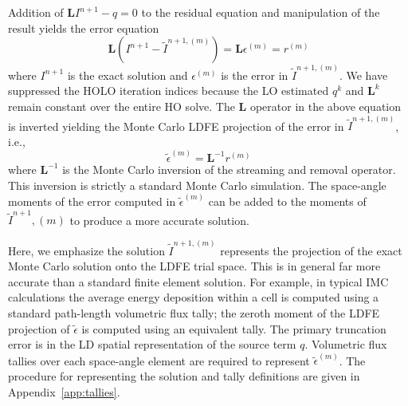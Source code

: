 \documentclass[12pt]{article}
\newcommand{\B}[1]{\ensuremath{\mathbf{#1}}}
\begin{document}
\begin{center}
Addition of $\B L I^{n+1} - q=0$ to the residual equation 
and manipulation of the result yields the error equation
\begin{equation}
    \B L (I^{n+1} - \tilde{I}^{n+1,(m)}) = \B L {\epsilon}^{(m)} = r^{(m)}
\end{equation}
where $I^{n+1}$ is the exact solution and ${\epsilon}^{(m)}$ is the error in
$\tilde{I}^{n+1,(m)}$. 
We have suppressed the HOLO iteration indices because the LO estimated $q^{k}$ and $\B L^{k}$ remain constant over the entire HO solve.
The $\B L$ operator in the above equation is inverted yielding
the Monte Carlo LDFE projection of the error in $\tilde{I}^{n+1,(m)}$, i.e., 
\begin{equation}
\tilde{\epsilon}^{(m)} = \B L^{-1} r^{(m)}
\end{equation}
where $\B L^{-1}$ is the Monte Carlo inversion of the streaming and removal operator.
This inversion is strictly a standard Monte Carlo simulation.  The space-angle moments of the
error computed in $\tilde{\epsilon}^{(m)}$ can be added to the moments of
$\tilde{I}^{n+1},(m)$ to produce a more accurate solution.

Here, we emphasize the solution $\tilde{I}^{n+1,(m)}$ represents the projection of the exact Monte Carlo
solution onto the LDFE trial space.  This is in general far more accurate than a standard
finite element solution.  For example, in typical IMC calculations the average energy
deposition within a cell is computed using a standard path-length volumetric flux
tally; the zeroth moment of the LDFE projection of $\tilde{\epsilon}$ is computed
using an equivalent tally.  The primary truncation error is in the LD spatial
representation of the source term $q$.  Volumetric flux tallies over
each space-angle element are required to represent $\tilde{\epsilon}^{(m)}$.  The
procedure for representing the solution and tally definitions are given in Appendix~\ref{app:tallies}.


\end{center}
\end{document}
